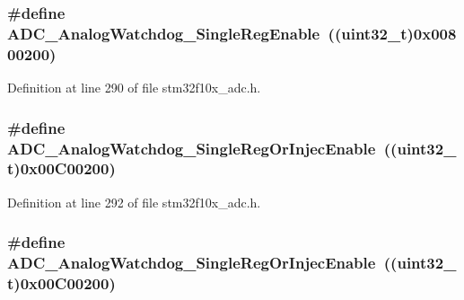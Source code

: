 \subsubsection[{\texorpdfstring{A\+D\+C\+\_\+\+Analog\+Watchdog\+\_\+\+Single\+Reg\+Enable}{ADC_AnalogWatchdog_SingleRegEnable}}]{\setlength{\rightskip}{0pt plus 5cm}\#define A\+D\+C\+\_\+\+Analog\+Watchdog\+\_\+\+Single\+Reg\+Enable~(({\bf uint32\+\_\+t})0x00800200)}\hypertarget{group___a_d_c__analog__watchdog__selection_ga2975552a752f44085d9da54b4e76121e}{}\label{group___a_d_c__analog__watchdog__selection_ga2975552a752f44085d9da54b4e76121e}


Definition at line 290 of file stm32f10x\+\_\+adc.\+h.

\subsubsection[{\texorpdfstring{A\+D\+C\+\_\+\+Analog\+Watchdog\+\_\+\+Single\+Reg\+Or\+Injec\+Enable}{ADC_AnalogWatchdog_SingleRegOrInjecEnable}}]{\setlength{\rightskip}{0pt plus 5cm}\#define A\+D\+C\+\_\+\+Analog\+Watchdog\+\_\+\+Single\+Reg\+Or\+Injec\+Enable~(({\bf uint32\+\_\+t})0x00\+C00200)}\hypertarget{group___a_d_c__analog__watchdog__selection_gaffd35fc6ceb226ec3fb61fb52227820c}{}\label{group___a_d_c__analog__watchdog__selection_gaffd35fc6ceb226ec3fb61fb52227820c}


Definition at line 292 of file stm32f10x\+\_\+adc.\+h.

\subsubsection[{\texorpdfstring{A\+D\+C\+\_\+\+Analog\+Watchdog\+\_\+\+Single\+Reg\+Or\+Injec\+Enable}{ADC_AnalogWatchdog_SingleRegOrInjecEnable}}]{\setlength{\rightskip}{0pt plus 5cm}\#define A\+D\+C\+\_\+\+Analog\+Watchdog\+\_\+\+Single\+Reg\+Or\+Injec\+Enable~(({\bf uint32\+\_\+t})0x00\+C00200)}\hypertarget{group___a_d_c__analog__watchdog__selection_gaffd35fc6ceb226ec3fb61fb52227820c}{}\label{group___a_d_c__analog__watchdog__selection_gaffd35fc6ceb226ec3fb61fb52227820c}



